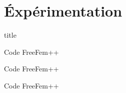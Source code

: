 \documentclass[french]{beamer}
\begin{document}
% 
%   
%   
%   
%     
%
%
  \section{Éxpérimentation}
  \begin{frame}
    \vfill
    \centering
    \begin{beamercolorbox}[sep=8pt,center,shadow=true,rounded=true]{title}
      \insertsectionhead
    \end{beamercolorbox}
    \vfill
  \end{frame}
  \begin{frame}{Code FreeFem++}
	\lstI
  \end{frame}
  \begin{frame}{Code FreeFem++}
	\lstII
  \end{frame}
  \begin{frame}{Code FreeFem++}
	\lstIII
  \end{frame}
\end{document}
